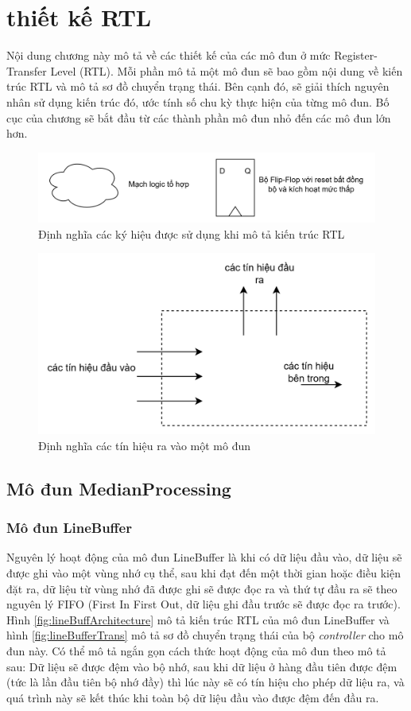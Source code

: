 \clearpage
{}

\setcounter{chapter}{2}
\chapter[{Thiết kế RTL}]{thiết kế RTL}
Nội dung chương này mô tả về các thiết kế của các mô đun ở mức Register-Transfer Level (RTL). Mỗi phần mô tả một mô đun sẽ bao gồm nội dung về kiến trúc RTL và mô tả sơ đồ chuyển trạng thái. Bên cạnh đó, sẽ giải thích nguyên nhân sử dụng kiến trúc đó, ước tính số chu kỳ thực hiện của từng mô đun. Bố cục của chương sẽ bắt đầu từ các thành phần mô đun nhỏ đến các mô đun lớn hơn.

\begin{figure}[!ht]
    \centering
    \includegraphics[width=1\linewidth]{figures/commonSymbol.png}
    \caption{Định nghĩa các ký hiệu được sử dụng khi mô tả kiến trúc RTL}
    \label{fig:commonSymbol}
\end{figure}
\begin{figure}[!ht]
	\centering
	\includegraphics[width=0.7\linewidth]{figures/boxSym.png}
	\caption{Định nghĩa các tín hiệu ra vào một mô đun}
	\label{fig:boxSym}
\end{figure}
\section{Mô đun MedianProcessing}
\subsection{Mô đun LineBuffer}
Nguyên lý hoạt động của mô đun LineBuffer là khi có dữ liệu đầu vào, dữ liệu sẽ được ghi vào một vùng nhớ cụ thể, sau khi đạt đến một thời gian hoặc điều kiện đặt ra, dữ liệu từ vùng nhớ đã được ghi sẽ được đọc ra và thứ tự đầu ra sẽ theo nguyên lý FIFO (First In First Out, dữ liệu ghi đầu trước sẽ được đọc ra trước). Hình \ref{fig:lineBuffArchitecture} mô tả kiến trúc RTL của mô đun LineBuffer và hình \ref{fig:lineBufferTrans} mô tả sơ đồ chuyển trạng thái của bộ \textit{controller} cho mô đun này. Có thể mô tả ngắn gọn cách thức hoạt động của mô đun theo mô tả sau: Dữ liệu sẽ được đệm vào bộ nhớ, sau khi dữ liệu ở hàng đầu tiên được đệm (tức là lần đầu tiên bộ nhớ đầy) thì lúc này sẽ có tín hiệu cho phép dữ liệu ra, và quá trình này sẽ kết thúc khi toàn bộ dữ liệu đầu vào được đệm đến đầu ra. 


